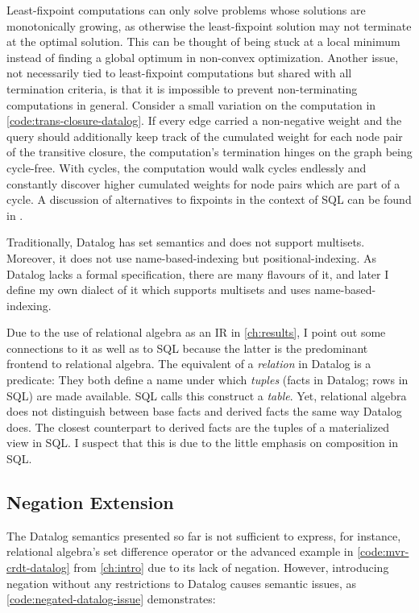 Least-fixpoint computations can only solve problems whose solutions
are monotonically growing, as otherwise the least-fixpoint solution may not
terminate at the optimal solution.
This can be thought of being stuck at a local minimum instead of finding
a global optimum in non-convex optimization.
Another issue, not necessarily tied to least-fixpoint computations but shared
with all termination criteria, is that it is impossible to prevent
non-terminating computations in general.
Consider a small variation on the computation in \ref{code:trans-closure-datalog}.
If every edge carried a non-negative weight and the query should additionally
keep track of the cumulated weight for each node pair of the transitive closure,
the computation's termination hinges on the graph being cycle-free.
With cycles, the computation would walk cycles endlessly and constantly discover
higher cumulated weights for node pairs which are part of a cycle.
A discussion of alternatives to fixpoints in the context of SQL
can be found in \cite{hirn2023fix}.

Traditionally, Datalog has set semantics and does not support multisets.
Moreover, it does not use name-based-indexing but positional-indexing.
As Datalog lacks a formal specification, there are many flavours of it,
and later I define my own dialect of it which supports multisets and
uses name-based-indexing.

Due to the use of relational algebra as an \ac{IR} in \ref{ch:results},
I point out some connections to it as well as to SQL
because the latter is the predominant frontend to relational algebra.
The equivalent of a \emph{relation} in Datalog is a predicate:
They both define a name under which \emph{tuples} (facts in Datalog; rows in SQL)
are made available. SQL calls this construct a \emph{table}.
Yet, relational algebra does not distinguish between base facts and derived facts
the same way Datalog does.
The closest counterpart to derived facts are the tuples of a materialized view
in SQL.
I suspect that this is due to the little emphasis on composition in SQL.

\subsection{Negation Extension}\label{sec:datalog-negation}

The Datalog semantics presented so far is not sufficient to express,
for instance, relational algebra's set difference operator or the advanced example
in \ref{code:mvr-crdt-datalog} from \ref{ch:intro} due to its lack of negation.
However, introducing negation without any restrictions to Datalog causes
semantic issues, as \ref{code:negated-datalog-issue} demonstrates:

